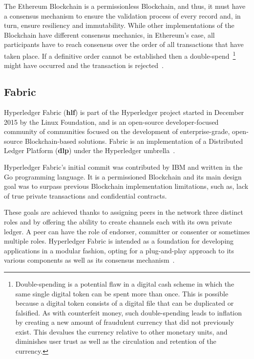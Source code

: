 The Ethereum Blockchain is a permissionless Blockchain, and thus, it must have
a consensus mechanism to ensure the validation process of every record and, in
turn, ensure resiliency and immutability. While other implementations of the
Blockchain have different consensus mechanics, in Ethereum’s case, all
participants have to reach consensus over the order of all transactions that
have taken place. If a definitive order cannot be established then a
double-spend~\footnote{Double-spending is a potential flaw in a digital cash
scheme in which the same single digital token can be spent more than once.
This is possible because a digital token consists of a digital file that can be
duplicated or falsified. As with counterfeit money, such double-spending leads
to inflation by creating a new amount of fraudulent currency that did not
previously exist. This devalues the currency relative to other monetary units,
and diminishes user trust as well as the circulation and retention of the
currency.} might have occurred and the transaction is rejected~\cite{Wood2017}.

\subsection{Fabric}

Hyperledger Fabric (\textbf{hlf}) is part of the Hyperledger project started in
December 2015 by the Linux Foundation, and is an open-source developer-focused
community of communities focused on the development of enterprise-grade,
open-source Blockchain-based solutions.  Fabric is an implementation of a
Distributed Ledger Platform (\textbf{dlp}) under the Hyperledger
umbrella~\cite{Cachin2016}.

Hyperledger Fabric’s initial commit was contributed by IBM and written in the
Go programming language.  It is a permissioned Blockchain and its main design
goal was to surpass previous Blockchain implementation limitations, such as,
lack of true private transactions and confidential contracts.

These goals are achieved thanks to assigning peers in the network three
distinct roles and by offering the ability to create channels each with its own
private ledger.  A peer can have the role of endorser, committer or consenter
or sometimes multiple roles.  Hyperledger Fabric is intended as a foundation
for developing applications in a modular fashion, opting for a plug-and-play
approach to its various components as well as its consensus
mechanism~\cite{HyperledgerFabricDocs2017}.

